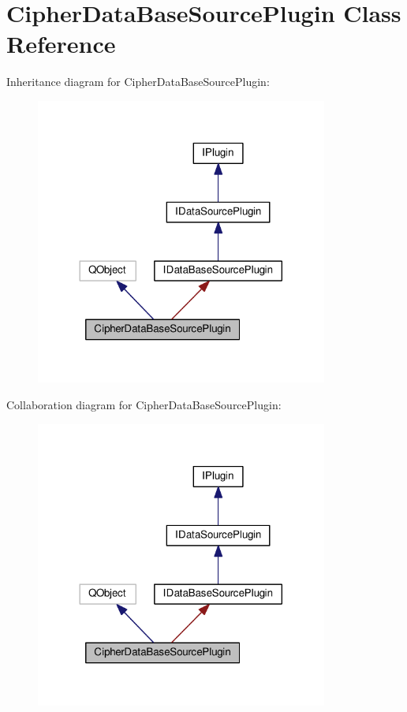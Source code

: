 \hypertarget{class_cipher_data_base_source_plugin}{}\section{Cipher\+Data\+Base\+Source\+Plugin Class Reference}
\label{class_cipher_data_base_source_plugin}


Inheritance diagram for Cipher\+Data\+Base\+Source\+Plugin\+:\nopagebreak
\begin{figure}[H]
\begin{center}
\leavevmode
\includegraphics[width=272pt]{class_cipher_data_base_source_plugin__inherit__graph}
\end{center}
\end{figure}


Collaboration diagram for Cipher\+Data\+Base\+Source\+Plugin\+:\nopagebreak
\begin{figure}[H]
\begin{center}
\leavevmode
\includegraphics[width=272pt]{class_cipher_data_base_source_plugin__coll__graph}
\end{center}
\end{figure}
